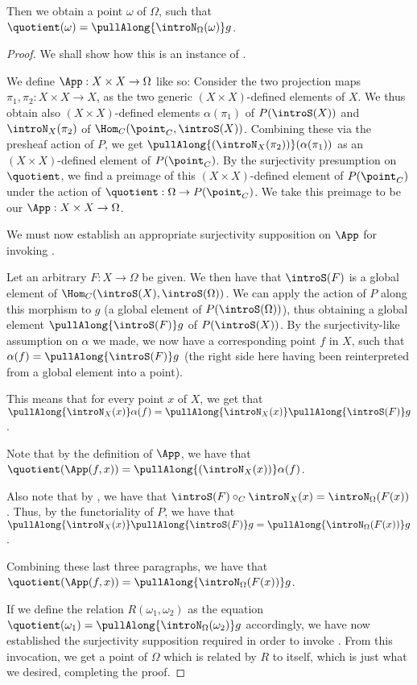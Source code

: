 Then we obtain a point $\omega$ of $\Omega$, such that $\quotient(\omega) = \pullAlong{\introN_{\Omega}(\omega)} g$.
\begin{proof}
We shall show how this is an instance of .

We define $\App : X \times X \to \Omega$ like so: Consider the two projection maps $\pi_1, \pi_2 : X \times X \to X$, as the two generic $(X \times X)$-defined elements of $X$. We thus obtain also $(X \times X)$-defined elements $\alpha(\pi_1)$ of $P(\introS(X))$ and $\introN_{X}(\pi_2)$ of $\Hom_C(\point_C, \introS(X))$. Combining these via the presheaf action of $P$, we get $\pullAlong{( \introN_{X}(\pi_2) )} ( \alpha(\pi_1) )$ as an $(X \times X)$-defined element of $P(\point_C)$. By the surjectivity presumption on $\quotient$, we find a preimage of this $(X \times X)$-defined element of $P(\point_C)$ under the action of $\quotient : \Omega \to P(\point_C)$. We take this preimage to be our $\App : X \times X \to \Omega$.

We must now establish an appropriate surjectivity supposition on $\App$ for invoking . 

Let an arbitrary $F : X \to \Omega$ be given. We then have that $\introS(F)$ is a global element of $\Hom_C(\introS(X), \introS(\Omega))$. We can apply the action of $P$ along this morphism to $g$ (a global element of $P(\introS(\Omega))$), thus obtaining a global element $\pullAlong{\introS(F)} g$ of $P(\introS(X))$. By the surjectivity-like assumption on $\alpha$ we made, we now have a corresponding point $f$ in $X$, such that $\alpha(f) = \pullAlong{\introS(F)} g$ (the right side here having been reinterpreted from a global element into a point).

This means that for every point $x$ of $X$, we get that $\pullAlong{\introN_{X}(x)} \alpha(f) = \pullAlong{\introN_{X}(x)} \pullAlong{\introS(F)} g$.

Note that by the definition of $\App$, we have that $\quotient(\App(f, x)) = \pullAlong{( \introN_{X}(x) )} \alpha(f)$.

Also note that by , we have that $\introS(F) \circ_C \introN_{X}(x) = \introN_{\Omega}(F(x))$. Thus, by the functoriality of $P$, we have that $\pullAlong{\introN_{X}(x)} \pullAlong{\introS(F)} g =  \pullAlong{\introN_{\Omega}(F(x))} g$.

Combining these last three paragraphs, we have that $\quotient(\App(f, x)) =  \pullAlong{\introN_{\Omega}(F(x))} g$.

If we define the relation $R(\omega_1, \omega_2)$ as the equation $\quotient(\omega_1) = \pullAlong{\introN_{\Omega}(\omega_2)} g$ accordingly, we have now established the surjectivity supposition required in order to invoke . From this invocation, we get a point of $\Omega$ which is related by $R$ to itself, which is just what we desired, completing the proof.

\end{proof}

